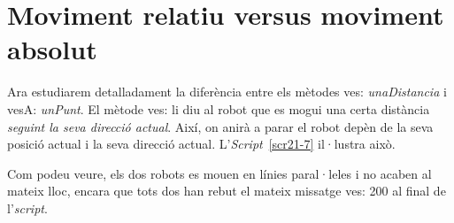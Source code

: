 \section{Moviment relatiu versus moviment absolut}
Ara estudiarem detalladament la diferència entre els mètodes \textsf{ves: {\itshape unaDistancia}} i \textsf{vesA: {\itshape unPunt}}. El mètode \textsf{ves:} li diu al robot que es mogui una certa distància \emph{seguint la seva direcció actual}. Així, on anirà a parar el robot depèn de la seva posició actual i la seva direcció actual. L'\emph{Script}~\ref{scr21-7} il·lustra això.


Com podeu veure, els dos robots es mouen en línies paral·leles  i no acaben al mateix lloc, encara que tots dos han rebut el mateix missatge \textsf{ves: 200} al final de l'\emph{script}.

